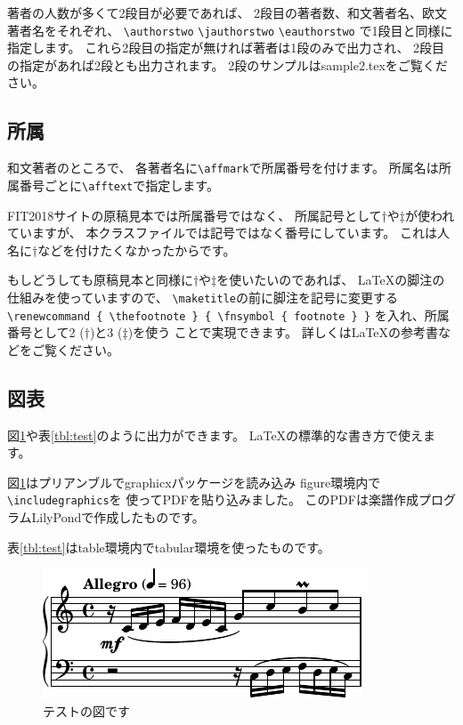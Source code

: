 \documentclass{FITpaper}
\begin{document}
著者の人数が多くて2段目が必要であれば、
2段目の著者数、和文著者名、欧文著者名をそれぞれ、
\texttt{\textbackslash authorstwo}
\texttt{\textbackslash jauthorstwo}
\texttt{\textbackslash eauthorstwo}
で1段目と同様に指定します。
これら2段目の指定が無ければ著者は1段のみで出力され、
2段目の指定があれば2段とも出力されます。
2段のサンプルはsample2.texをご覧ください。

\subsection{所属}

和文著者のところで、
各著者名に\texttt{\textbackslash af\mbox{}fmark}で所属番号を付けます。
所属名は所属番号ごとに\texttt{\textbackslash af\mbox{}ftext}で指定します。

FIT2018サイトの原稿見本では所属番号ではなく、
所属記号として$\dag$や$\ddag$が使われていますが、
本クラスファイルでは記号ではなく番号にしています。
これは人名に$\dag$などを付けたくなかったからです。

もしどうしても原稿見本と同様に$\dag$や$\ddag$を使いたいのであれば、
\LaTeX の脚注の仕組みを使っていますので、
\texttt{\textbackslash maketitle}の前に脚注を記号に変更する
\texttt{\textbackslash renewcommand \{
  \textbackslash thefootnote \} \{
  \textbackslash fnsymbol \{ footnote \} \}}
を入れ、所属番号として2 ($\dag$)と3 ($\ddag$)を使う
ことで実現できます。
詳しくは\LaTeX の参考書などをご覧ください。

\subsection{図表}

図\ref{fig:test}や表\ref{tbl:test}のように出力ができます。
\LaTeX の標準的な書き方で使えます。

図\ref{fig:test}はプリアンブルでgraphicxパッケージを読み込み
figure環境内で\texttt{\textbackslash includegraphics}を
使ってPDFを貼り込みました。
このPDFは楽譜作成プログラムLilyPond\cite{lilypond}で作成したものです。

表\ref{tbl:test}はtable環境内でtabular環境を使ったものです。

\begin{figure}
  \centering
  \includegraphics{invention1}
  \caption{テストの図です}
  \label{fig:test}
\end{figure}
\end{document}
